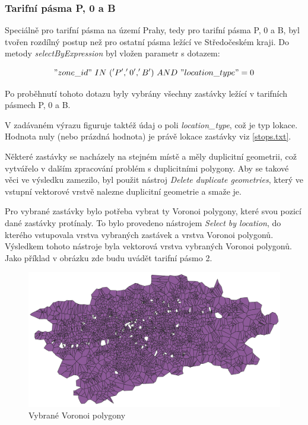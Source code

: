 \subsubsection{Tarifní pásma P, 0 a B}

Speciálně pro tarifní pásma na území Prahy, tedy pro tarifní pásma P, 0 a B, byl tvořen rozdílný postup
než pro ostatní pásma ležící ve Středočeském kraji. Do metody \textit{selectByExpression} byl vložen
parametr s dotazem: 

\["zone\_id"\ IN\ ('P','0','B')\ AND\ "location\_type" = 0\]

Po proběhnutí tohoto dotazu byly vybrány všechny zastávky ležící v tarifních pásmech P, 0 a B. 

V zadávaném výrazu figuruje taktéž údaj o poli \textit{location\_type}, což je typ lokace. 
Hodnota nuly (nebo prázdná hodnota) je právě lokace zastávky viz \ref{stops.txt}.

Některé zastávky se nacházely na stejném místě a měly duplicitní geometrii, což vytvářelo v dalším
zpracování problém s duplicitními polygony. Aby se takové věci ve výsledku zamezilo, byl použit nástroj   
\textit{Delete duplicate geometries}, který ve vstupní vektorové vrstvě nalezne duplicitní geometrie a smaže je.

Pro vybrané zastávky bylo potřeba vybrat ty Voronoi polygony, které svou
pozicí dané zastávky protínaly. To bylo provedeno nástrojem \textit{Select by location},
do kterého vstupovala vrstva vybraných zastávek a vrstva Voronoi polygonů. Výsledkem tohoto nástroje byla
vektorová vrstva vybraných Voronoi polygonů. Jako příklad v obrázku zde budu uvádět tarifní pásmo 2.

\begin{figure}[H] \centering
    \includegraphics[width=400pt]{./pictures/voronoi-selected-P0B.png}
    \caption[Vybrané Voronoi polygony]{Vybrané Voronoi polygony}
	\label{fig:voronoi-selected}              
\end{figure}

